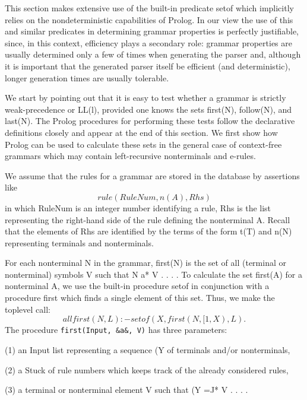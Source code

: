 \label{cohen5}

This section makes extensive use of the built-in predicate setof which implicitly
relies on the nondeterministic capabilities of Prolog. In our view the use of this
and similar predicates in determining grammar properties is perfectly justifiable,
since, in this context, efficiency plays a secondary role: grammar properties are 
usually determined only a few of times when generating the parser and, although
it is important that the generated parser itself be efficient (and deterministic),
longer generation times are usually tolerable. 

We start by pointing out that it is easy to test whether a grammar is strictly
weak-precedence or LL(l), provided one knows the sets first(N), follow(N), and
last(N). The Prolog procedures for performing these tests follow the declarative
definitions closely and appear at the end of this section. We first show how
Prolog can be used to calculate these sets in the general case of context-free
grammars which may contain left-recursive nonterminals and e-rules. 

We assume that the rules for a grammar are stored in the database by assertions
like
\[rule(RuleNum, n(A), Rhs)\]
in which RuleNum is an integer number identifying a rule, Rhs is the list
representing the right-hand side of the rule defining the nonterminal A. Recall
that the elements of Rhs are identified by the terms of the form t(T) and n(N)
representing terminals and nonterminals. 

For each nonterminal N in the grammar, first(N) is the set of all (terminal or
nonterminal) symbols V such that N a* V . . . . To calculate the set first(A) for
a nonterminal A, we use the built-in procedure setof in conjunction with a
procedure first which finds a single element of this set. Thus, we make the toplevel
call:
\[allfirst(N, L) :- setof(X, first(N, [ 1, X), L).\]
The procedure \verb|first(Input, &a&, V)| has three parameters:

(1) an Input list representing a sequence (Y of terminals and/or nonterminals,

(2) a Stuck of rule numbers which keeps track of the already considered rules,

(3) a terminal or nonterminal element V such that (Y =J* V . . . .

